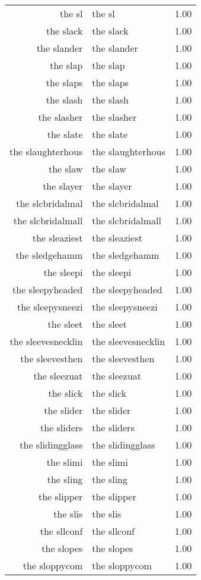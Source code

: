 \begin{table}[ht]
\begin{tabular}{rlr}
  the sl & the sl & 1.00 \\ 
  the slack & the slack & 1.00 \\ 
  the slander & the slander & 1.00 \\ 
  the slap & the slap & 1.00 \\ 
  the slaps & the slaps & 1.00 \\ 
  the slash & the slash & 1.00 \\ 
  the slasher & the slasher & 1.00 \\ 
  the slate & the slate & 1.00 \\ 
  the slaughterhous & the slaughterhous & 1.00 \\ 
  the slaw & the slaw & 1.00 \\ 
  the slayer & the slayer & 1.00 \\ 
  the slcbridalmal & the slcbridalmal & 1.00 \\ 
  the slcbridalmall & the slcbridalmall & 1.00 \\ 
  the sleaziest & the sleaziest & 1.00 \\ 
  the sledgehamm & the sledgehamm & 1.00 \\ 
  the sleepi & the sleepi & 1.00 \\ 
  the sleepyheaded & the sleepyheaded & 1.00 \\ 
  the sleepysneezi & the sleepysneezi & 1.00 \\ 
  the sleet & the sleet & 1.00 \\ 
  the sleevesnecklin & the sleevesnecklin & 1.00 \\ 
  the sleevesthen & the sleevesthen & 1.00 \\ 
  the sleezuat & the sleezuat & 1.00 \\ 
  the slick & the slick & 1.00 \\ 
  the slider & the slider & 1.00 \\ 
  the sliders & the sliders & 1.00 \\ 
  the slidingglass & the slidingglass & 1.00 \\ 
  the slimi & the slimi & 1.00 \\ 
  the sling & the sling & 1.00 \\ 
  the slipper & the slipper & 1.00 \\ 
  the slis & the slis & 1.00 \\ 
  the sllconf & the sllconf & 1.00 \\ 
  the slopes & the slopes & 1.00 \\ 
  the sloppycom & the sloppycom & 1.00 \\ 

\end{tabular}
\end{table}
